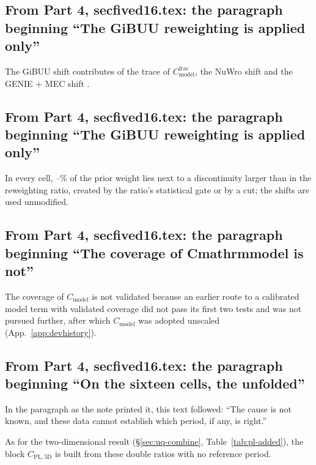 \subsection{From Part 4, secfived16.tex: the paragraph beginning ``The GiBUU reweighting is applied only''}
The GiBUU shift contributes  of the trace of $C_{\mathrm{model}}^{\mathrm{frac}}$, the NuWro shift  and the GENIE + MEC shift .

\subsection{From Part 4, secfived16.tex: the paragraph beginning ``The GiBUU reweighting is applied only''}
In every cell, --\% of the prior weight lies next to a discontinuity larger than  in the reweighting ratio, created by the ratio's statistical gate or by a cut; the shifts are used unmodified.

\subsection{From Part 4, secfived16.tex: the paragraph beginning ``The coverage of Cmathrmmodel is not''}
The coverage of $C_{\mathrm{model}}$ is not validated because an earlier route to a calibrated model term with validated coverage did not pass its first two tests and was not pursued further, after which $C_{\mathrm{model}}$ was adopted unscaled (App.~\ref{app:devhistory}).

\subsection{From Part 4, secfived16.tex: the paragraph beginning ``On the sixteen cells, the unfolded''}
In the paragraph as the note printed it, this text followed: ``The cause is not known, and these data cannot establish which period, if any, is right.''\par
As for the two-dimensional result (\S\ref{sec:uq-combine}, Table~\ref{tab:pl-added}), the block $C_{\mathrm{PL,5D}}$ is built from these double ratios with no reference period.

